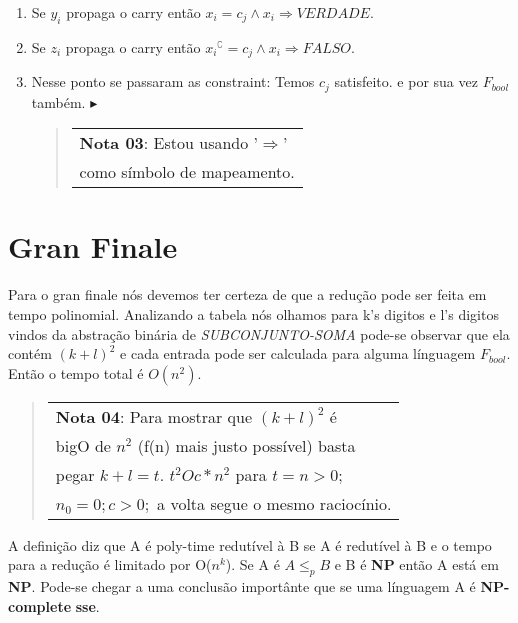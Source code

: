 \documentclass[12pt, a4paper]{article}
\begin{document}
\begin{enumerate}
\item Se $y_i$ propaga o carry então $x_i = c_j  \wedge x_i \Rightarrow \textit{VERDADE}$.

\item Se $z_i$ propaga o carry então ${x_i}^\complement = c_j \wedge x_i \Rightarrow \textit{FALSO}$.

\item Nesse ponto se passaram as constraint: Temos $c_j$ satisfeito. e por sua vez $F_{bool}$ também. $\blacktriangleright$

\begin{quote}
  \flushright
    \begin{tabular}{|l}
\textbf{Nota 03}: Estou usando '$\Rightarrow$' \\ como símbolo de mapeamento.
  \end{tabular}
\end{quote}

\end{enumerate}

\section{Gran Finale}

Para o gran finale nós devemos ter certeza de que a redução pode ser feita em tempo polinomial. Analizando a tabela nós olhamos para k's digitos e l's digitos vindos da abstração binária de \textit{SUBCONJUNTO-SOMA} pode-se observar que ela contém ${(k + l)}^2$ e cada entrada pode ser calculada para alguma línguagem $F_{bool}$. Então o tempo total é $O(n^2)$.

\begin{quote}
  \flushright
    \begin{tabular}{|l}
				\textbf{Nota 04}: Para mostrar que ${(k + l)}^2$ é\\
				bigO de $n^2$ (f(n) mais justo possível) basta\\
				pegar $ k + l = t $. $t^2 Oc*{n}^2$ para $t=n>0;$\\
				$n_0=0; c>0;$ a volta segue o mesmo raciocínio.\\
  \end{tabular}
\end{quote}


A definição diz que A é poly-time redutível à B se A é redutível à B e o tempo para a redução é limitado por O($n^k$). Se A é $A \leqslant_{p} B$ e B é \textbf{NP} então A está em \textbf{NP}. Pode-se chegar a uma conclusão importânte que se uma línguagem A é \textbf{NP-complete} \textbf{sse}. \cite{sipser06}
\end{document}

